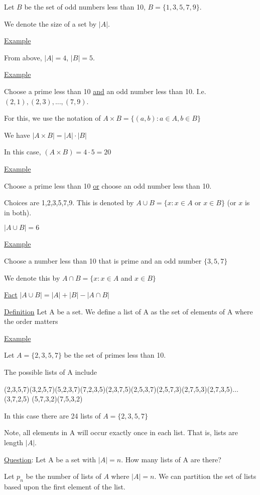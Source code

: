 \documentclass{article}
\begin{document}
Let $B$ be the set of odd numbers less than 10, $B = \{1,3,5,7,9\}$.

We denote the size of a set by $|A|$.

\underline{Example}

From above, $|A|= 4$, $|B| = 5$.

\underline{Example}

Choose a prime less than 10 \underline{and} an odd number less than 10. I.e. $(2,1),(2,3),...,(7,9)$.

For this, we use the notation of $A \times B = \{(a,b): a \in A, b \in B\}$

We have $|A \times B| = |A| \cdot |B|$

In this case, $(A \times B) = 4 \cdot 5 = 20$

\underline{Example}

Choose a prime less than 10 \underline{or} choose an odd number less than 10. 

Choices are 1,2,3,5,7,9. This is denoted by $A \cup B = \{x: x \in A$  or  $x \in B \}$ (or $x$ is in both).  

$|A \cup B| = 6$

\underline{Example}

Choose a number less than 10 that is prime and an odd number $\{3,5,7\}$

We denote this by $A \cap B = \{x: x \in A$ and $x \in B\}$ 

\underline{Fact} $|A \cup B| = |A| + |B| - |A \cap B|$

\underline{Definition} Let A be a set. We define a list of A as the set of elements of A where the order matters

\underline{Example}

Let $A = \{2,3,5,7\}$ be the set of primes less than 10. 

The possible lists of A include

(2,3,5,7)(3,2,5,7)(5,2,3,7)(7,2,3,5)(2,3,7,5)(2,5,3,7)(2,5,7,3)(2,7,5,3)(2,7,3,5)$\ldots$(3,7,2,5) (5,7,3,2)(7,5,3,2)

In this case there are 24 lists of $A = \{2,3,5,7\}$

Note, all elements in A will occur exactly once in each list. That is, lists are length $|A|$. 

\underline{Question}: Let A be a set with $|A| = n$. How many lists of A are there?

Let $p_n$ be the number of lists of $A$ where $|A| = n$. We can partition the set of lists based upon the first element of the list. 
\end{document}

